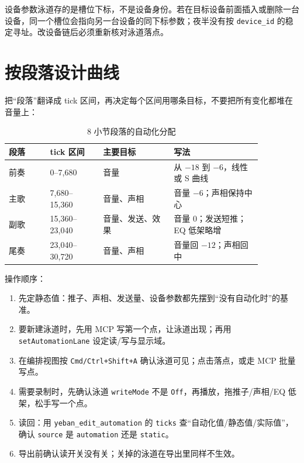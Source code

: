 
设备参数泳道存的是槽位下标，不是设备身份。若在目标设备前面插入或删除一台设备，同一个槽位会指向另一台设备的同下标参数；夜半没有按 \texttt{device\_id} 的稳定寻址。改设备链后必须重新核对泳道落点。

\section{按段落设计曲线}

把“段落”翻译成 tick 区间，再决定每个区间用哪条目标，不要把所有变化都堆在音量上：

\begin{table}[htbp]
\centering
\small
\begin{tabular}{@{}p{0.14\linewidth}p{0.18\linewidth}p{0.24\linewidth}p{0.30\linewidth}@{}}
\hline
段落 & tick 区间 & 主要目标 & 写法 \\
\hline
前奏 & 0–7{,}680 & 音量 & 从 $-18$ 到 $-6$，线性或 S 曲线 \\
主歌 & 7{,}680–15{,}360 & 音量、声相 & 音量 $-6$；声相保持中心 \\
副歌 & 15{,}360–23{,}040 & 音量、发送、效果 & 音量 0；发送短推；EQ 低架略增 \\
尾奏 & 23{,}040–30{,}720 & 音量、声相 & 音量回 $-12$；声相回中 \\
\hline
\end{tabular}
\caption{8 小节段落的自动化分配}
\label{tab:automation-section-plan}
\end{table}

操作顺序：

\begin{enumerate}
  \item 先定静态值：推子、声相、发送量、设备参数都先摆到“没有自动化时”的基准。
  \item 要新建泳道时，先用 MCP 写第一个点，让泳道出现；再用 \texttt{set\allowbreak Automation\allowbreak Lane} 设定读/写与显示域。
  \item 在编排视图按 \texttt{Cmd/\allowbreak Ctrl+Shift+A} 确认泳道可见；点击落点，或走 MCP 批量写点。
  \item 需要录制时，先确认泳道 \texttt{writeMode} 不是 \texttt{Off}，再播放，拖推子/声相/EQ 低架，松手写一个点。
  \item 读回：用 \texttt{yeban\_edit\_automation} 的 \texttt{ticks} 查“自动化值/静态值/实际值”，确认 \texttt{source} 是 \texttt{automation} 还是 \texttt{static}。
  \item 导出前确认读开关没有关；关掉的泳道在导出里同样不生效。
\end{enumerate}

